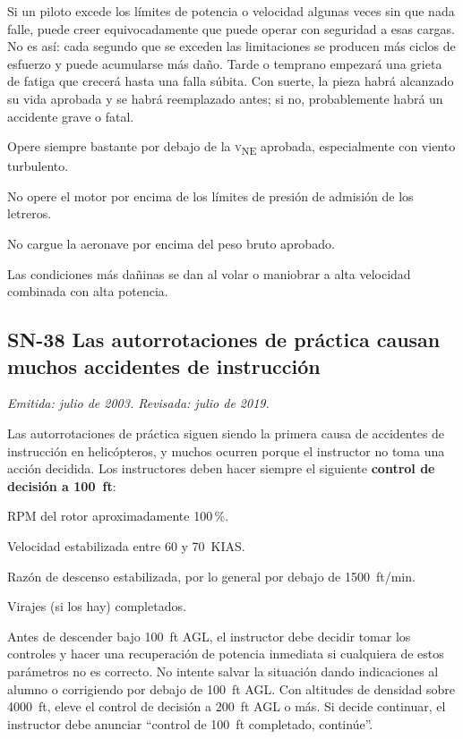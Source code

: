 Si un piloto excede los límites de potencia o velocidad algunas veces sin que nada falle, puede creer equivocadamente que puede operar con seguridad a esas cargas. No es así: cada segundo que se exceden las limitaciones se producen más ciclos de esfuerzo y puede acumularse más daño. Tarde o temprano empezará una grieta de fatiga que crecerá hasta una falla súbita. Con suerte, la pieza habrá alcanzado su vida aprobada y se habrá reemplazado antes; si no, probablemente habrá un accidente grave o fatal.

\begin{advertencia}
\begin{pasos}
\item Opere siempre bastante por debajo de la \textsc{v}\textsubscript{NE} aprobada, especialmente con viento turbulento.
\item No opere el motor por encima de los límites de presión de admisión de los letreros.
\item No cargue la aeronave por encima del peso bruto aprobado.
\item Las condiciones más dañinas se dan al volar o maniobrar a alta velocidad combinada con alta potencia.
\end{pasos}
\end{advertencia}

\subsection*{SN-38 \quad Las autorrotaciones de práctica causan muchos accidentes de instrucción}
{\small\textit{Emitida: julio de 2003. Revisada: julio de 2019.}}

Las autorrotaciones de práctica siguen siendo la primera causa de accidentes de instrucción en helicópteros, y muchos ocurren porque el instructor no toma una acción decidida. Los instructores deben hacer siempre el siguiente \textbf{control de decisión a 100~ft}:

\begin{pasos}
\item RPM del rotor aproximadamente 100\,\%.
\item Velocidad estabilizada entre 60 y 70~KIAS.
\item Razón de descenso estabilizada, por lo general por debajo de 1500~ft/min.
\item Virajes (si los hay) completados.
\end{pasos}

Antes de descender bajo 100~ft AGL, el instructor debe decidir tomar los controles y hacer una recuperación de potencia inmediata si cualquiera de estos parámetros no es correcto. No intente salvar la situación dando indicaciones al alumno o corrigiendo por debajo de 100~ft AGL. Con altitudes de densidad sobre 4000~ft, eleve el control de decisión a 200~ft AGL o más. Si decide continuar, el instructor debe anunciar ``control de 100~ft completado, continúe''.


